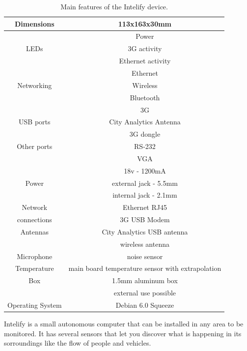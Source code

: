 \documentclass{llncs}
\begin{document}
\begin{table}[htpb]
\begin{center}
\begin{tabular}{|c|c|}
\hline
Dimensions & 113x163x30mm \\
\hline
     & Power             \\
LEDs & 3G activity       \\
     & Ethernet activity \\
\hline
           & Ethernet  \\
Networking & Wireless  \\
           & Bluetooth \\  
           & 3G        \\
\hline
USB ports & City Analytics Antenna \\
		  & 3G dongle              \\
\hline
Other ports & RS-232 \\
			& VGA    \\
\hline
 	  & 18v - 1200mA          \\
Power & external jack - 5.5mm \\
      & internal jack - 2.1mm \\
\hline
Network     & Ethernet RJ45 \\
connections & 3G USB Modem  \\
\hline
Antennas & City Analytics USB antenna \\
		 & wireless antenna \\
\hline
Microphone & noise sensor \\
\hline
Temperature & main board temperature sensor with extrapolation \\
\hline
Box & 1.5mm aluminum box \\
    & external use possible  \\
\hline
Operating System & Debian 6.0 Squeeze  \\
\hline
\end{tabular}
\end{center}
\caption{Main features of the Intelify device.}
\label{caracteristicas}
\end{table}

Intelify is a small autonomous computer that can be installed in any area to be monitored. 
It has several sensors that let you discover what is happening in its sorroundings like the flow of people and vehicles.

\end{document}
